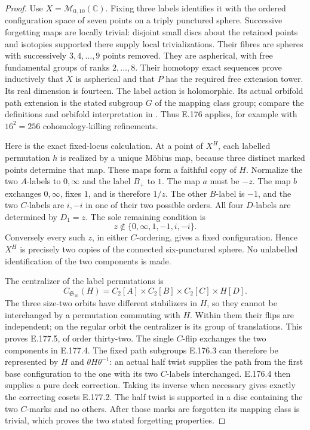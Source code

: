 \begin{proof}
Use \(X=\mathcal M_{0,10}(\mathbb C)\).  Fixing three
labels identifies it with the ordered configuration
space of seven points on a triply punctured sphere.
Successive forgetting maps are locally trivial:
disjoint small discs about the retained points and
isotopies supported there supply local trivializations.
Their fibres are spheres with successively
\(3,4,\ldots,9\) points removed.  They are aspherical,
with free fundamental groups of ranks \(2,\ldots,8\).
Their homotopy exact sequences prove inductively that
\(X\) is aspherical and that \(P\) has the required
free extension tower.  Its real dimension is fourteen.
The label action is holomorphic.  Its actual orbifold
path extension is the stated subgroup \(G\) of the
mapping class group; compare the definitions and
orbifold interpretation in
\cite[\S\S1--2, pp.656--660]{LitSchneps2006Automorphisms}.
Thus E.176 applies, for example with \(16^2=256\)
cohomology-killing refinements.

Here is the exact fixed-locus calculation.  At a point
of \(X^H\), each labelled permutation \(h\) is realized
by a unique Möbius map, because three distinct marked
points determine that map.  These maps form a faithful
copy of \(H\).  Normalize the two \(A\)-labels to
\(0,\infty\) and the label \(B_+\) to \(1\).
The map \(a\) must be \(-z\).  The map \(b\) exchanges
\(0,\infty\), fixes \(1\), and is therefore \(1/z\).
The other \(B\)-label is \(-1\), and the two \(C\)-labels
are \(i,-i\) in one of their two possible orders.
All four \(D\)-labels are determined by \(D_1=z\).
The sole remaining condition is
\[
                  z\notin\{0,\infty,1,-1,i,-i\}.
\tag{E.177.4}
\]
Conversely every such \(z\), in either \(C\)-ordering,
gives a fixed configuration.  Hence \(X^H\) is
precisely two copies of the connected six-punctured
sphere.  No unlabelled identification of the two
components is made.

The centralizer of the label permutations is
\[
 C_{\mathfrak S_{10}}(H)
        =C_2[A]\times C_2[B]\times C_2[C]\times H[D].
\tag{E.177.5}
\]
The three size-two orbits have different stabilizers
in \(H\), so they cannot be interchanged by a
permutation commuting with \(H\).  Within them their
flips are independent; on the regular orbit the
centralizer is its group of translations.  This
proves E.177.5, of order thirty-two.
The single \(C\)-flip exchanges the two components
in E.177.4.  The fixed path subgroups E.176.3 can
therefore be represented by \(H\) and
\(\theta H\theta^{-1}\): an actual half twist supplies
the path from the first base configuration to the
one with its two \(C\)-labels interchanged.
E.176.4 then supplies a pure deck correction.
Taking its inverse when necessary gives exactly
the correcting cosets E.177.2.
The half twist is supported in a disc containing
the two \(C\)-marks and no others.  After those
marks are forgotten its mapping class is trivial,
which proves the two stated forgetting properties.


\end{proof}
